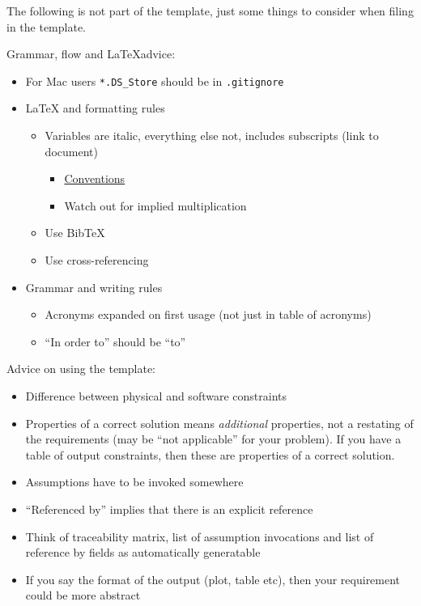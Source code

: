 \documentclass[12pt]{article}
\begin{document}
\noindent The following is not part of the template, just some things to consider
  when filing in the template.

\noindent Grammar, flow and \LaTeX advice:
\begin{itemize}
\item For Mac users \texttt{*.DS\_Store} should be in \texttt{.gitignore}
\item \LaTeX{} and formatting rules
\begin{itemize}
\item Variables are italic, everything else not, includes subscripts (link to
  document)
\begin{itemize}
\item \href{https://physics.nist.gov/cuu/pdf/typefaces.pdf}{Conventions}
\item Watch out for implied multiplication
\end{itemize}
\item Use BibTeX
\item Use cross-referencing
\end{itemize}
\item Grammar and writing rules
\begin{itemize}
\item Acronyms expanded on first usage (not just in table of acronyms)
\item ``In order to'' should be ``to''
\end{itemize}
\end{itemize}

\noindent Advice on using the template:
\begin{itemize}
\item Difference between physical and software constraints
\item Properties of a correct solution means \emph{additional} properties, not
  a restating of the requirements (may be ``not applicable'' for your problem).
  If you have a table of output constraints, then these are properties of a
  correct solution.
\item Assumptions have to be invoked somewhere
\item ``Referenced by'' implies that there is an explicit reference
\item Think of traceability matrix, list of assumption invocations and list of
  reference by fields as automatically generatable
\item If you say the format of the output (plot, table etc), then your
  requirement could be more abstract
\end{itemize}
\end{document}
